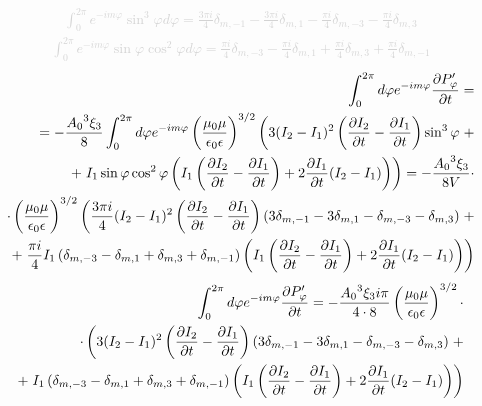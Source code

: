 %
\textcolor{lightgray} { \begin{equation*} \begin{aligned}
\int_{0}^{2\pi} e^{-i m \varphi} \sin^3 \varphi d \varphi = 
\frac{3 \pi i}{4} \delta_{m,-1} - \frac{3 \pi i}{4} \delta_{m,1} - 
\frac{\pi i}{4} \delta_{m,-3} - \frac{\pi i}{4} \delta_{m,3}
\end{aligned} \end{equation*} }
%
\textcolor{lightgray} { \begin{equation*} \begin{aligned}
\int_{0}^{2\pi} e^{-i m \varphi} \sin \varphi \cos^2 \varphi d \varphi = 
\frac{\pi i }{4} \delta_{m,-3} - \frac{\pi i }{4} \delta_{m,1} + 
\frac{\pi i }{4} \delta_{m,3} + \frac{\pi i }{4} \delta_{m,-1}
\end{aligned} \end{equation*} }
%
\textcolor{lightgray} { \begin{equation*} \begin{aligned}
\int_{0}^{2 \pi} d \varphi e^{-im \varphi} \frac{\partial P_\varphi^\prime}{\partial t} = \\
= - \frac{ {A_0}^3 \xi_3 }{ 8 } \int_{0}^{2 \pi} d \varphi e^{-im \varphi}
\left( \frac{\mu_0 \mu} {\epsilon_0 \epsilon} \right)^{3/2} \left(
3 ( I_2 - I_1 )^2 \left( \frac{\partial I_2}{\partial t} - \frac{\partial I_1}{\partial t} \right)
\sin^3 \varphi \right. + \\
+ \left. I_1 \sin \varphi \cos^2 \varphi \left( 
I_1 \left( \frac{\partial I_2}{\partial t} - \frac{\partial I_1}{\partial t} \right) + 
2 \frac{\partial I_1}{\partial t} (I_2 - I_1) \right) \right) = 
- \frac{ {A_0}^3 \xi_3 }{ 8 V } \cdot \\ 
\cdot \left( \frac{\mu_0 \mu} {\epsilon_0 \epsilon} \right)^{3/2} \left(
\frac{3 \pi i}{4} ( I_2 - I_1 )^2 \left( \frac{\partial I_2}{\partial t} - 
\frac{\partial I_1}{\partial t} \right) \left( 3 \delta_{m,-1} - 3 \delta_{m,1} - 
\delta_{m,-3} - \delta_{m,3} \right) \right. + \\
+ \left. \frac{\pi i}{4} I_1 \left(  \delta_{m,-3} - \delta_{m,1} + 
\delta_{m,3} + \delta_{m,-1} \right) \left( 
I_1 \left( \frac{\partial I_2}{\partial t} - \frac{\partial I_1}{\partial t} \right) + 
2 \frac{\partial I_1}{\partial t} (I_2 - I_1) \right) \right)
\end{aligned} \end{equation*} }
%
\begin{equation*} \begin{aligned}
\int_{0}^{2 \pi} d \varphi e^{-im \varphi} \frac{\partial P_\varphi^\prime}{\partial t} = 
- \frac{ {A_0}^3 \xi_3  i \pi }{ 4 \cdot 8 }
\left( \frac{\mu_0 \mu} {\epsilon_0 \epsilon} \right)^{3/2} \cdot \\ 
\cdot \left( 3 ( I_2 - I_1 )^2 \left( \frac{\partial I_2}{\partial t} - 
\frac{\partial I_1}{\partial t} \right) \left( 3 \delta_{m,-1} - 3 \delta_{m,1} - 
\delta_{m,-3} - \delta_{m,3} \right) \right. + \\
+ \left. I_1 \left(  \delta_{m,-3} - \delta_{m,1} + 
\delta_{m,3} + \delta_{m,-1} \right) \left( 
I_1 \left( \frac{\partial I_2}{\partial t} - \frac{\partial I_1}{\partial t} \right) + 
2 \frac{\partial I_1}{\partial t} (I_2 - I_1) \right) \right)
\end{aligned} \end{equation*}
